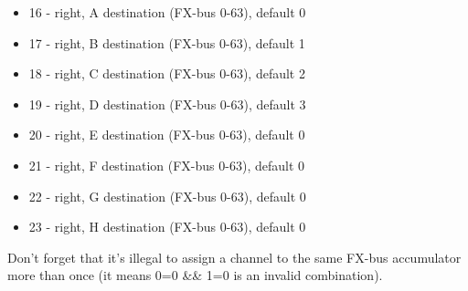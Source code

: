 \documentclass[a4paper,8pt,english]{sphinxmanual}
\begin{document}
\begin{itemize}
\item {} 
16 - right, A destination (FX-bus 0-63), default 0

\item {} 
17 - right, B destination (FX-bus 0-63), default 1

\item {} 
18 - right, C destination (FX-bus 0-63), default 2

\item {} 
19 - right, D destination (FX-bus 0-63), default 3

\item {} 
20 - right, E destination (FX-bus 0-63), default 0

\item {} 
21 - right, F destination (FX-bus 0-63), default 0

\item {} 
22 - right, G destination (FX-bus 0-63), default 0

\item {} 
23 - right, H destination (FX-bus 0-63), default 0

\end{itemize}

Don't forget that it's illegal to assign a channel to the same FX-bus accumulator
more than once (it means 0=0 \&\& 1=0 is an invalid combination).
\end{document}
